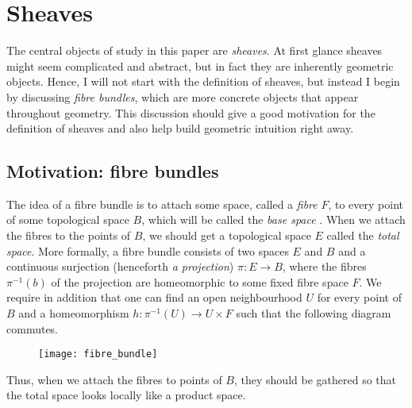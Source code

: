 \section{Sheaves}
The central objects of study in this paper are \emph{sheaves}. At first
glance sheaves might seem complicated and abstract, but in fact they are
inherently geometric objects. Hence, I will not start with the
definition of sheaves, but instead I begin by discussing
\emph{fibre bundles}, which are more concrete objects that appear throughout 
geometry. This discussion should give a good motivation for
the definition of sheaves and also help build geometric intuition right
away.

\subsection{Motivation: fibre bundles}
The idea of a fibre bundle is to attach some space, called a \emph{fibre}
$F$, to every point of some topological space $B$, which will be called
the \emph{base space} \cite{hatcher}. When we attach the fibres to the
points of $B$, we should get a topological space $E$ called the
\emph{total space}. More formally, a fibre bundle consists of two spaces $E$
and $B$ and a continuous surjection (henceforth \emph{a projection})
$\pi:E\to B$, where the fibres $\pi^{-1}(b)$ of the projection are
homeomorphic to some fixed fibre space $F$. We require in addition
that one can find an open neighbourhood $U$ for every point of $B$ and a
homeomorphism $h:\pi^{-1}(U)\to U\times F$ such that the following diagram
commutes.
\begin{figure}[H]
  \centering
  \begin{minipage}{.45\textwidth}
    \centering
  \end{minipage}%
  \begin{minipage}{.45\textwidth}
    \centering %
    \texttt{[image: fibre\_bundle]}
  \end{minipage}
\end{figure}
Thus, when we attach the fibres to points of $B$, they should be gathered
so that the total space looks locally like a product space.


